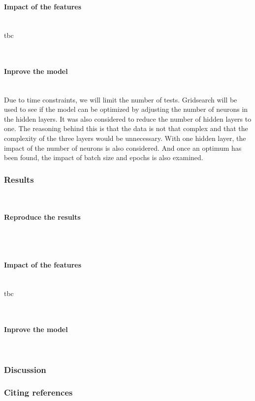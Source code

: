 \documentclass{article}
\newcommand{\subsubsubsection}[1]{%
  \paragraph{#1}\mbox{}\\}
\begin{document}
\subsubsubsection{Impact of the features}
tbc

\subsubsubsection{Inprove the model}
Due to time constraints, we will limit the number of tests. Gridsearch will be used to see if the model can be optimized by adjusting the number of neurons in the hidden layers.
It was also considered to reduce the number of hidden layers to one. The reasoning behind this is that the data is not that complex and that the complexity of the three layers would be unnecessary. With one hidden layer, the impact of the number of neurons is also considered. And once an optimum has been found, the impact of batch size and epochs is also examined.

\subsubsection{Results}

\subsubsubsection{Reproduce the results}


\subsubsubsection{Impact of the features}
tbc

\subsubsubsection{Inprove the model}


\subsubsection{Discussion}




\subsubsection{Citing references}




\end{document}
